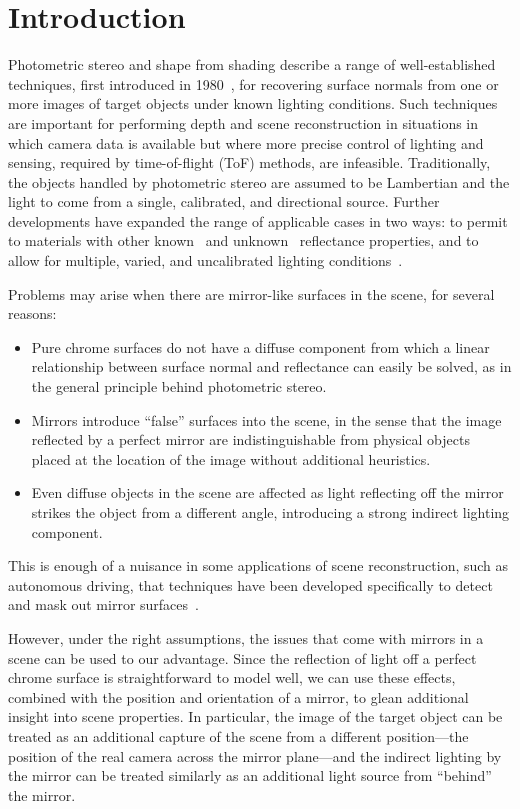 \section{Introduction}\label{sec:introduction}
Photometric stereo and shape from shading describe a range of well-established
techniques, first introduced in 1980~\cite{woodham1979}, for recovering surface
normals from one or more images of target objects under known lighting
conditions. Such techniques are important for performing depth and scene
reconstruction in situations in which camera data is available but where more
precise control of lighting and sensing, required by time-of-flight (ToF)
methods, are infeasible. Traditionally, the objects handled by photometric
stereo are assumed to be Lambertian and the light to come from a single,
calibrated, and directional source. Further developments have expanded the
range of applicable cases in two ways: to permit to materials with other
known~\cite{defigueiredo} and unknown~\cite{hertzmann} reflectance properties,
and to allow for multiple, varied, and uncalibrated lighting
conditions~\cite{basri2001-12}.

Problems may arise when there are mirror-like surfaces in the scene, for
several reasons:
\begin{itemize}
  \item Pure chrome surfaces do not have a diffuse component from which a
  linear relationship between surface normal and reflectance can easily be
  solved, as in the general principle behind photometric stereo.
  \item Mirrors introduce ``false'' surfaces into the scene, in the sense that
  the image reflected by a perfect mirror are indistinguishable from physical
  objects placed at the location of the image without additional heuristics.
  \item Even diffuse objects in the scene are affected as light reflecting off
  the mirror strikes the object from a different angle, introducing a strong
  indirect lighting component.
\end{itemize}
This is enough of a nuisance in some applications of scene reconstruction, such
as autonomous driving, that techniques have been developed specifically to
detect and mask out mirror surfaces~\cite{yang}.

However, under the right assumptions, the issues that come with mirrors in a
scene can be used to our advantage. Since the reflection of light off a perfect
chrome surface is straightforward to model well, we can use these effects,
combined with the position and orientation of a mirror, to glean additional
insight into scene properties. In particular, the image of the target object
can be treated as an additional capture of the scene from a different
position---the position of the real camera across the mirror plane---and the
indirect lighting by the mirror can be treated similarly as an additional light
source from ``behind'' the mirror.

